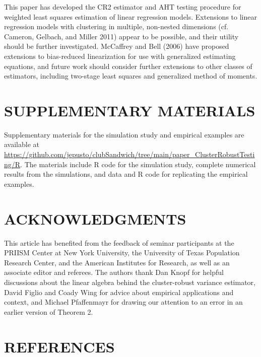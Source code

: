 \documentclass[12pt]{article}
\begin{document}
This paper has developed the CR2 estimator and AHT testing procedure for
weighted least squares estimation of linear regression models.
Extensions to linear regression models with clustering in multiple,
non-nested dimensions (cf. Cameron, Gelbach, and Miller 2011) appear to
be possible, and their utility should be further investigated. McCaffrey
and Bell (2006) have proposed extensions to bias-reduced linearization
for use with generalized estimating equations, and future work should
consider further extensions to other classes of estimators, including
two-stage least squares and generalized method of moments.

\hypertarget{supplementary-materials}{%
\section*{SUPPLEMENTARY MATERIALS}\label{supplementary-materials}}

Supplementary materials for the simulation study and empirical examples
are available at
\url{https://github.com/jepusto/clubSandwich/tree/main/paper_ClusterRobustTesting/R}.
The materials include R code for the simulation study, complete
numerical results from the simulations, and data and R code for
replicating the empirical examples.

\hypertarget{acknowledgments}{%
\section*{ACKNOWLEDGMENTS}\label{acknowledgments}}

This article has benefited from the feedback of seminar participants at
the PRIISM Center at New York University, the University of Texas
Population Research Center, and the American Institutes for Research, as
well as an associate editor and referees. The authors thank Dan Knopf
for helpful discussions about the linear algebra behind the
cluster-robust variance estimator, David Figlio and Coady Wing for
advice about empirical applications and context, and Michael Pfaffenmayr
for drawing our attention to an error in an earlier version of Theorem
2.

\newpage

\hypertarget{references}{%
\section*{REFERENCES}\label{references}}
\end{document}
